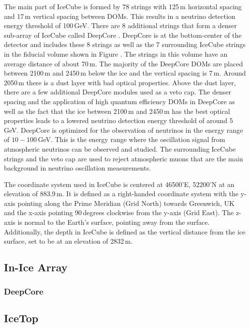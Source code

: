 The main part of IceCube is formed by 78 strings with 125\,m horizontal spacing and 17\,m vertical spacing between DOMs.
This results in a neutrino detection energy threshold of 100\,GeV. There are 8 additional strings that form a denser sub-array of IceCube called DeepCore .
DeepCore is at the bottom-center of the detector and includes these 8 strings as well as the 7 surrounding IceCube strings in the fiducial volume shown in Figure .
The strings in this volume have an average distance of about 70\,m.
The majority of the DeepCore DOMs are placed between 2100\,m and 2450\,m below the ice and the vertical spacing is 7\,m.
Around 2050\,m there is a dust layer with bad optical properties. Above the dust layer, there are a few additional DeepCore modules used as a veto cap.
The denser spacing and the application of high quantum efficiency DOMs in DeepCore as well as the fact that the ice between 2100\,m and 2450\,m has the best optical properties leads to a lowered neutrino detection energy threshold of around 5\,GeV.
DeepCore is optimized for the observation of neutrinos in the energy range of $10-100$\,GeV.
This is the energy range where the oscillation signal from atmospheric neutrinos can be observed and studied.
The surrounding IceCube strings and the veto cap are used to reject atmospheric muons that are the main background in neutrino oscillation measurements.

The coordinate system  used in IceCube is centered at 46500'E, 52200'N at an elevation of 883.9\,m.
It is defined as a right-handed coordinate system with the y-axis pointing along the Prime Meridian (Grid North) towards Greenwich, UK and the x-axis pointing 90\,degrees clockwise from the y-axis (Grid East).
The z-axis is normal to the  Earth's surface, pointing away from the surface.
Additionally, the depth in IceCube is defined as the vertical distance from the ice surface, set to be at an elevation of 2832\,m.


\subsection{In-Ice Array}

\subsubsection{DeepCore}

\subsection{IceTop}

